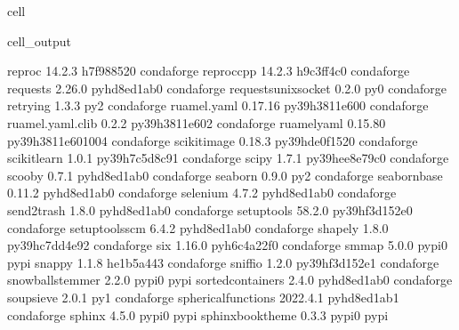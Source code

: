 \documentclass[letterpaper,table,10pt,english]{jupyterBook}
\begin{document}
\begin{sphinxuseclass}{cell}
\begin{sphinxVerbatimOutput}
\begin{sphinxuseclass}{cell_output}
\begin{sphinxVerbatim}[commandchars=\\\{\}]
reproc                    14.2.3               h7f98852\PYGZus{}0    conda\PYGZhy{}forge
reproc\PYGZhy{}cpp                14.2.3               h9c3ff4c\PYGZus{}0    conda\PYGZhy{}forge
requests                  2.26.0             pyhd8ed1ab\PYGZus{}0    conda\PYGZhy{}forge
requests\PYGZhy{}unixsocket       0.2.0                      py\PYGZus{}0    conda\PYGZhy{}forge
retrying                  1.3.3                      py\PYGZus{}2    conda\PYGZhy{}forge
ruamel.yaml               0.17.16          py39h3811e60\PYGZus{}0    conda\PYGZhy{}forge
ruamel.yaml.clib          0.2.2            py39h3811e60\PYGZus{}2    conda\PYGZhy{}forge
ruamel\PYGZus{}yaml               0.15.80         py39h3811e60\PYGZus{}1004    conda\PYGZhy{}forge
scikit\PYGZhy{}image              0.18.3           py39hde0f152\PYGZus{}0    conda\PYGZhy{}forge
scikit\PYGZhy{}learn              1.0.1            py39h7c5d8c9\PYGZus{}1    conda\PYGZhy{}forge
scipy                     1.7.1            py39hee8e79c\PYGZus{}0    conda\PYGZhy{}forge
scooby                    0.7.1              pyhd8ed1ab\PYGZus{}0    conda\PYGZhy{}forge
seaborn                   0.9.0                      py\PYGZus{}2    conda\PYGZhy{}forge
seaborn\PYGZhy{}base              0.11.2             pyhd8ed1ab\PYGZus{}0    conda\PYGZhy{}forge
selenium                  4.7.2              pyhd8ed1ab\PYGZus{}0    conda\PYGZhy{}forge
send2trash                1.8.0              pyhd8ed1ab\PYGZus{}0    conda\PYGZhy{}forge
setuptools                58.2.0           py39hf3d152e\PYGZus{}0    conda\PYGZhy{}forge
setuptools\PYGZhy{}scm            6.4.2              pyhd8ed1ab\PYGZus{}0    conda\PYGZhy{}forge
shapely                   1.8.0            py39hc7dd4e9\PYGZus{}2    conda\PYGZhy{}forge
six                       1.16.0             pyh6c4a22f\PYGZus{}0    conda\PYGZhy{}forge
smmap                     5.0.0                    pypi\PYGZus{}0    pypi
snappy                    1.1.8                he1b5a44\PYGZus{}3    conda\PYGZhy{}forge
sniffio                   1.2.0            py39hf3d152e\PYGZus{}1    conda\PYGZhy{}forge
snowballstemmer           2.2.0                    pypi\PYGZus{}0    pypi
sortedcontainers          2.4.0              pyhd8ed1ab\PYGZus{}0    conda\PYGZhy{}forge
soupsieve                 2.0.1                      py\PYGZus{}1    conda\PYGZhy{}forge
spherical\PYGZus{}functions       2022.4.1           pyhd8ed1ab\PYGZus{}1    conda\PYGZhy{}forge
sphinx                    4.5.0                    pypi\PYGZus{}0    pypi
sphinx\PYGZhy{}book\PYGZhy{}theme         0.3.3                    pypi\PYGZus{}0    pypi

\end{sphinxVerbatim}
\end{sphinxuseclass}
\end{sphinxVerbatimOutput}
\end{sphinxuseclass}
\end{document}

